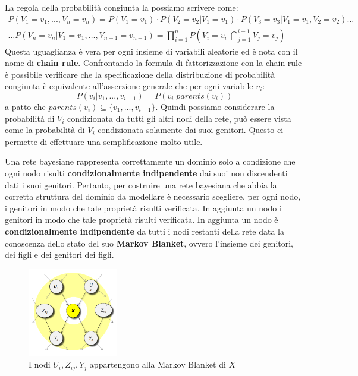 La regola della probabilità congiunta la possiamo scrivere come:
\begin{equation*}
    \begin{aligned}
        P(V_1= v_1,...,V_n = v_n) = P(V_1 = v_1) \cdot P(V_2 = v_2|V_1 = v_1)
        \cdot P(V_3 = v_3|V_1 = v_1,V_2 = v_2) \dots \\
        \dots P(V_n = v_n|V_1 = v_1, \dots,V_{n-1}=v_{n-1}) = \prod_{i=1}^{n}
        P(V_i = v_i| \bigcap_{j = 1}^{i - 1} V_j= v_j)
    \end{aligned}
\end{equation*}
Questa uguaglianza è vera per ogni insieme di variabili aleatorie ed è nota con
il nome di \textbf{chain rule}. Confrontando la formula di fattorizzazione con
la chain rule è possibile verificare che la specificazione della distribuzione
di probabilità congiunta è equivalente all'asserzione generale che per ogni
variabile $v_i$:
\begin{equation}
    P(v_i|v_1,...,v_{i-1}) = P(v_i|parents(v_i))
\end{equation}
a patto che $parents(v_i) \subseteq \{v_1,...,v_{i-1}\}$. Quindi possiamo
considerare la probabilità di $V_i$ condizionata da tutti gli altri nodi della
rete, può essere vista come la probabilità di $V_i$ condizionata solamente dai
suoi genitori. Questo ci permette di effettuare una semplificazione molto utile.

Una rete bayesiane rappresenta correttamente un dominio solo a condizione che ogni
nodo risulti \textbf{condizionalmente indipendente} dai suoi non discendenti
dati i suoi genitori. Pertanto, per costruire una rete bayesiana che abbia la
corretta struttura del dominio da modellare è necessario scegliere, per ogni nodo,
i genitori in modo che tale proprietà risulti verificata. In aggiunta un nodo
i genitori in modo che tale proprietà risulti verificata. In aggiunta un nodo
è \textbf{condizionalmente indipendente} da tutti i nodi restanti della rete data
la conoscenza dello stato del suo \textbf{Markov Blanket}, ovvero l'insieme dei
genitori, dei figli e dei genitori dei figli.
\begin{figure}[!ht]
    \centering
    \includegraphics[width=0.35\textwidth]{./img/Reti/MarkovBlanket.png}
    \caption{I nodi $U_i, Z_{ij}, Y_j$ appartengono alla Markov Blanket di $X$}
    \label{fig:MarkovBlanket}
\end{figure}

